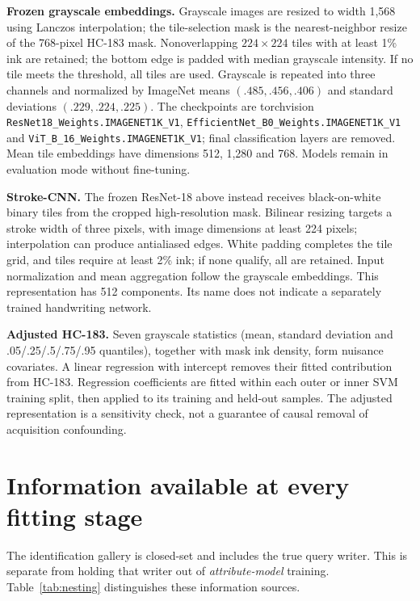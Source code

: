\documentclass[10pt,a4paper]{article}
\begin{document}
\textbf{Frozen grayscale embeddings.} Grayscale images are resized to width 1,568 using Lanczos interpolation; the tile-selection mask is the nearest-neighbor resize of the 768-pixel HC-183 mask. Nonoverlapping $224\times224$ tiles with at least 1\% ink are retained; the bottom edge is padded with median grayscale intensity. If no tile meets the threshold, all tiles are used. Grayscale is repeated into three channels and normalized by ImageNet means $(.485,.456,.406)$ and standard deviations $(.229,.224,.225)$. The checkpoints are torchvision \texttt{ResNet18\_Weights.IMAGENET1K\_V1}, \texttt{EfficientNet\_B0\_Weights.IMAGENET1K\_V1} and \texttt{ViT\_B\_16\_Weights.IMAGENET1K\_V1}; final classification layers are removed. Mean tile embeddings have dimensions 512, 1,280 and 768. Models remain in evaluation mode without fine-tuning.

\textbf{Stroke-CNN.} The frozen ResNet-18 above instead receives black-on-white binary tiles from the cropped high-resolution mask. Bilinear resizing targets a stroke width of three pixels, with image dimensions at least 224 pixels; interpolation can produce antialiased edges. White padding completes the tile grid, and tiles require at least 2\% ink; if none qualify, all are retained. Input normalization and mean aggregation follow the grayscale embeddings. This representation has 512 components. Its name does not indicate a separately trained handwriting network.

\textbf{Adjusted HC-183.} Seven grayscale statistics (mean, standard deviation and .05/.25/.5/.75/.95 quantiles), together with mask ink density, form nuisance covariates. A linear regression with intercept removes their fitted contribution from HC-183. Regression coefficients are fitted within each outer or inner SVM training split, then applied to its training and held-out samples. The adjusted representation is a sensitivity check, not a guarantee of causal removal of acquisition confounding.

\section{Information available at every fitting stage}
The identification gallery is closed-set and includes the true query writer. This is separate from holding that writer out of \emph{attribute-model} training. Table~\ref{tab:nesting} distinguishes these information sources.
\end{document}

